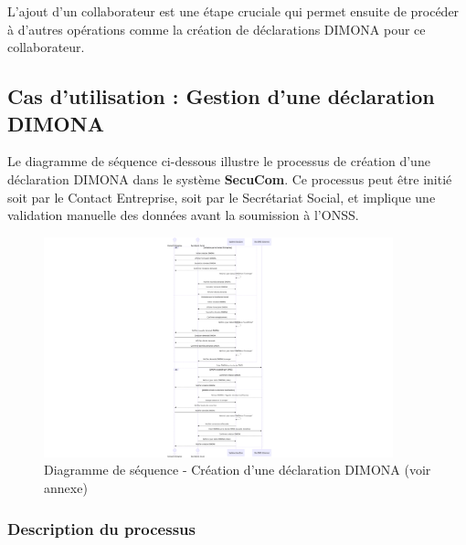 L'ajout d'un collaborateur est une étape cruciale qui permet ensuite de procéder à d'autres opérations comme la création de déclarations DIMONA pour ce collaborateur.

\newpage
\subsection{Cas d'utilisation : Gestion d'une déclaration DIMONA}

\noindent Le diagramme de séquence ci-dessous illustre le processus de création d'une déclaration DIMONA dans le système \textbf{SecuCom}. Ce processus peut être initié soit par le Contact Entreprise, soit par le Secrétariat Social, et implique une validation manuelle des données avant la soumission à l'ONSS.

\begin{figure}[H]
\centering
\includegraphics[width=0.9\textwidth]{SD_creation_dimona.png}
\caption{Diagramme de séquence - Création d'une déclaration DIMONA (voir annexe)}
\end{figure}

\subsubsection{Description du processus}

